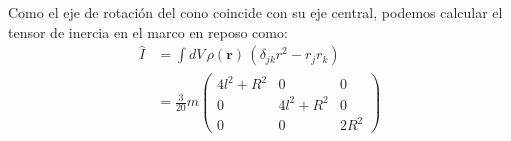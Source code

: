 \documentclass[]{article}
\numberwithin{equation}{section}
\newcommand{\0}{\textcolor{gray}{0}}
\newcommand{\rv}{\mathbf{r}}
\begin{document}
Como el eje de rotación del cono coincide con su eje central, podemos calcular el tensor de inercia en el marco en reposo como:
\begin{align}
	\hat{I} &= \int dV \, \rho(\rv) \, (\delta_{jk} r^2 - r_{j} r_{k}) \nonumber\\
	&= \frac{3}{20} m \begin{pmatrix}
		4 l^2+R^2 & 0 & 0 \\
		0 & 4 l^2+R^2 & 0 \\
		0 & 0 & 2 R^2
	\end{pmatrix}
\end{align}
\end{document}
